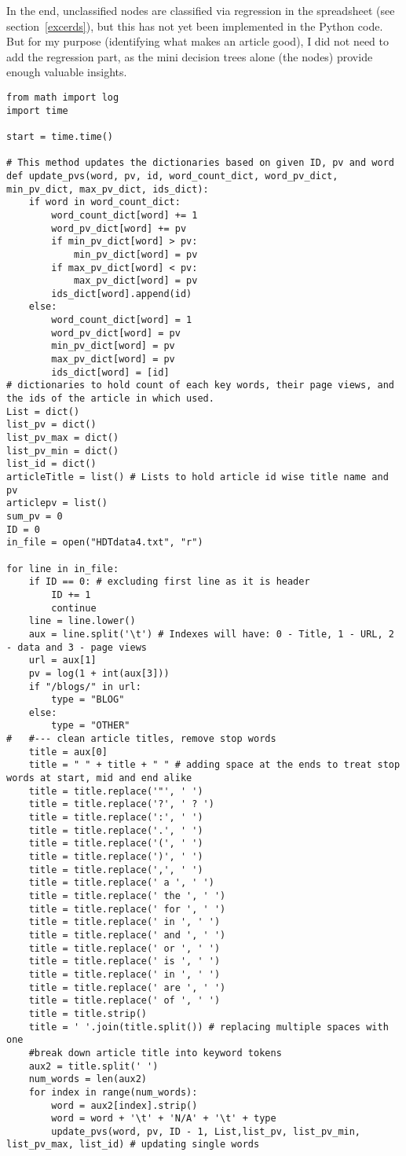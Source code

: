 \documentclass[oneside,10pt]{book}
\begin{document}
In the end, unclassified nodes are classified via regression in the spreadsheet (see section~\ref{excerds}), but this has not yet been implemented in the Python code.
 But for my purpose (identifying what makes an article good), I did not need to add the regression part, as the mini decision trees alone (the nodes) provide enough valuable insights. \\


\begin{lstlisting}
from math import log
import time

start = time.time()

# This method updates the dictionaries based on given ID, pv and word
def update_pvs(word, pv, id, word_count_dict, word_pv_dict, min_pv_dict, max_pv_dict, ids_dict):
    if word in word_count_dict:
        word_count_dict[word] += 1
        word_pv_dict[word] += pv
        if min_pv_dict[word] > pv:
            min_pv_dict[word] = pv
        if max_pv_dict[word] < pv:
            max_pv_dict[word] = pv
        ids_dict[word].append(id)
    else:
        word_count_dict[word] = 1
        word_pv_dict[word] = pv
        min_pv_dict[word] = pv
        max_pv_dict[word] = pv
        ids_dict[word] = [id]
# dictionaries to hold count of each key words, their page views, and the ids of the article in which used.
List = dict()
list_pv = dict()
list_pv_max = dict()
list_pv_min = dict()
list_id = dict()
articleTitle = list() # Lists to hold article id wise title name and pv
articlepv = list()
sum_pv = 0
ID = 0
in_file = open("HDTdata4.txt", "r")

for line in in_file:
    if ID == 0: # excluding first line as it is header
        ID += 1
        continue
    line = line.lower()
    aux = line.split('\t') # Indexes will have: 0 - Title, 1 - URL, 2 - data and 3 - page views
    url = aux[1]
    pv = log(1 + int(aux[3]))
    if "/blogs/" in url:
        type = "BLOG"
    else:
        type = "OTHER"
#   #--- clean article titles, remove stop words
    title = aux[0]
    title = " " + title + " " # adding space at the ends to treat stop words at start, mid and end alike
    title = title.replace('"', ' ')
    title = title.replace('?', ' ? ')
    title = title.replace(':', ' ')
    title = title.replace('.', ' ')
    title = title.replace('(', ' ')
    title = title.replace(')', ' ')
    title = title.replace(',', ' ')
    title = title.replace(' a ', ' ')
    title = title.replace(' the ', ' ')
    title = title.replace(' for ', ' ')
    title = title.replace(' in ', ' ')
    title = title.replace(' and ', ' ')
    title = title.replace(' or ', ' ')
    title = title.replace(' is ', ' ')
    title = title.replace(' in ', ' ')
    title = title.replace(' are ', ' ')
    title = title.replace(' of ', ' ')
    title = title.strip()
    title = ' '.join(title.split()) # replacing multiple spaces with one
    #break down article title into keyword tokens
    aux2 = title.split(' ')
    num_words = len(aux2)
    for index in range(num_words):
        word = aux2[index].strip()
        word = word + '\t' + 'N/A' + '\t' + type
        update_pvs(word, pv, ID - 1, List,list_pv, list_pv_min, list_pv_max, list_id) # updating single words


\end{lstlisting}
\end{document}
